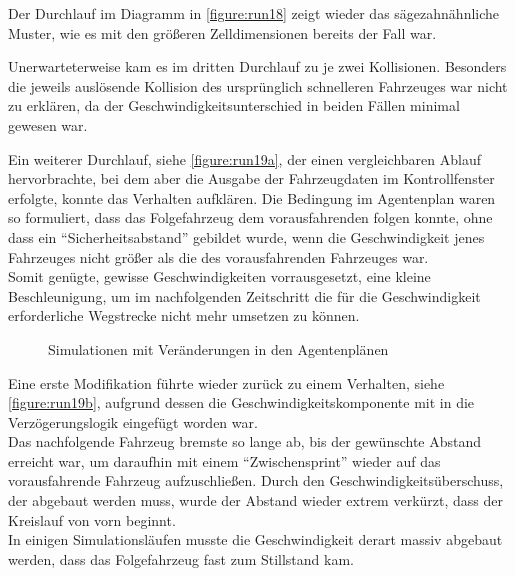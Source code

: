 Der Durchlauf im Diagramm in \cref{figure:run18} zeigt wieder das sägezahnähnliche Muster, wie es mit den größeren Zelldimensionen bereits der Fall war.

Unerwarteterweise kam es im dritten Durchlauf zu je zwei Kollisionen.
Besonders die jeweils auslösende Kollision des ursprünglich schnelleren Fahrzeuges war nicht zu erklären, da der Geschwindigkeitsunterschied in beiden Fällen minimal gewesen war.

Ein weiterer Durchlauf, siehe \cref{figure:run19a}, der einen vergleichbaren Ablauf hervorbrachte, bei dem aber die Ausgabe der Fahrzeugdaten im Kontrollfenster erfolgte, konnte das Verhalten aufklären.
Die Bedingung im Agentenplan waren so formuliert, dass das Folgefahrzeug dem vorausfahrenden folgen konnte, ohne dass ein \enquote{Sicherheitsabstand} gebildet wurde, wenn die Geschwindigkeit jenes Fahrzeuges nicht größer als die des vorausfahrenden Fahrzeuges war. 
\\
Somit genügte, gewisse Geschwindigkeiten vorrausgesetzt, eine kleine Beschleunigung, um im nachfolgenden Zeitschritt die für die Geschwindigkeit erforderliche Wegstrecke nicht mehr umsetzen zu können.

\begin{figure}[hptb]
  \centering 
   \qquad 
   \qquad 
  \caption{Simulationen mit Veränderungen in den Agentenplänen} 
  \label{figure:run19a-c}
\end{figure}

Eine erste Modifikation führte wieder zurück zu einem Verhalten, siehe \cref{figure:run19b}, aufgrund dessen die Geschwindigkeitskomponente mit in die Verzögerungslogik eingefügt worden war. 
\\
Das nachfolgende Fahrzeug bremste so lange ab, bis der gewünschte Abstand erreicht war, um daraufhin mit einem \enquote{Zwischensprint} wieder auf das vorausfahrende Fahrzeug aufzuschließen.
Durch den Geschwindigkeitsüberschuss, der abgebaut werden muss, wurde der Abstand wieder extrem verkürzt, dass der Kreislauf von vorn beginnt.
\\
In einigen Simulationsläufen musste die Geschwindigkeit derart massiv abgebaut werden, dass das Folgefahrzeug fast zum Stillstand kam.

